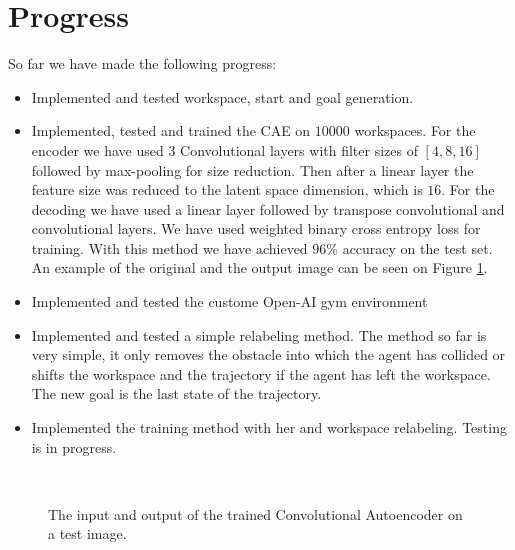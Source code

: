 \documentclass[conference]{IEEEtran}
\begin{document}
\section{Progress}

So far we have made the following progress:
\begin{itemize}
	\item Implemented and tested workspace, start and goal generation.
	\item Implemented, tested and trained the CAE on $10000$ workspaces. For the encoder we have used 3 Convolutional layers with filter sizes of $[4, 8, 16]$ followed by max-pooling for size reduction. Then after a linear layer the feature size was reduced to the latent space dimension, which is $16$. For the decoding we have used a linear layer followed by transpose convolutional and convolutional layers. We have used weighted binary cross entropy loss for training. With this method we have achieved $96\%$ accuracy on the test set. An example of the original and the output image can be seen on Figure \ref{fig:2}.
	\item Implemented and tested the custome Open-AI gym environment
	\item Implemented and tested a simple relabeling method. The method so far is very simple, it only removes the obstacle into which the agent has collided or shifts the workspace and the trajectory if the agent has left the workspace. The new goal is the last state of the trajectory.
	\item Implemented the training method with her and workspace relabeling. Testing is in progress.
\end{itemize}

\begin{figure}
	\begin{center}
		~
	\end{center}
	\vspace{-4mm}
	\caption{The input and output of the trained Convolutional Autoencoder on a test image.}
	\label{fig:2}
	\vspace{-0mm}
\end{figure}
\end{document}
